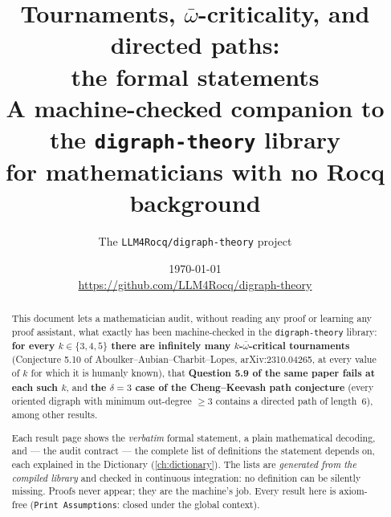 %
%



\title{\textbf{Tournaments, $\bar\omega$-criticality, and directed
    paths:\\ the formal statements}\\[1ex]
  \large A machine-checked companion to the \texttt{digraph-theory}
  library\\ for mathematicians with no Rocq background}
\author{The \texttt{LLM4Rocq/digraph-theory} project}
\date{\today\\[1ex]\normalsize
  \url{https://github.com/LLM4Rocq/digraph-theory}}


\maketitle

\begin{abstract}
\noindent
This document lets a mathematician audit, without reading any proof or
learning any proof assistant, what exactly has been machine-checked in
the \texttt{digraph-theory} library: \textbf{for every $k \in
\{3,4,5\}$ there are infinitely many $k$-$\bar\omega$-critical
tournaments} (Conjecture 5.10 of Aboulker--Aubian--Charbit--Lopes,
arXiv:2310.04265, at every value of $k$ for which it is humanly known),
that \textbf{Question 5.9 of the same paper fails at each such $k$},
and \textbf{the $\delta = 3$ case of the Cheng--Keevash path
conjecture} (every oriented digraph with minimum out-degree $\ge 3$
contains a directed path of length~$6$), among other results.

Each result page shows the \emph{verbatim} formal statement, a plain
mathematical decoding, and --- the audit contract --- the complete list
of definitions the statement depends on, each explained in the
Dictionary (\cref{ch:dictionary}). The lists are \emph{generated from
the compiled library} and checked in continuous integration: no
definition can be silently missing. Proofs never appear; they are the
machine's job. Every result here is axiom-free
(\texttt{Print Assumptions}: closed under the global context).
\end{abstract}

